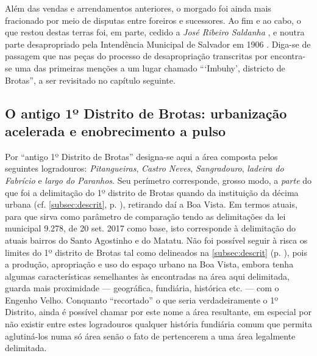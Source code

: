 Além das vendas e arrendamentos anteriores, o morgado foi ainda mais fracionado por meio de disputas entre foreiros e sucessores. Ao fim e ao cabo, o que restou destas terras foi, em parte, cedido a \textit{José Ribeiro Saldanha}%
, e noutra parte desapropriado pela Intendência Municipal de Salvador em 1906 \cite[p.~III-13 - III-14]{teixeira_doacoes_1978}. Diga-se de passagem que nas peças do processo de desapropriação transcritas por  encontra-se uma das primeiras menções a um lugar chamado ```Imbuhy', districto de Brotas'', a ser revisitado no capítulo seguinte.


\subsection{O antigo 1º Distrito de Brotas: urbanização acelerada e enobrecimento a pulso}\label{subsec:pitangueiras}

Por ``antigo 1º Distrito de Brotas'' designa-se aqui a área composta pelos seguintes logradouros: \textit{Pitangueiras}, \textit{Castro Neves}, \textit{Sangradouro}, \textit{ladeira do Fabrício} e \textit{largo do Paranhos}. Seu perímetro corresponde, grosso modo, a \textit{parte} do que foi a delimitação do 1º distrito de Brotas quando da instituição da décima urbana (cf. \autoref{subsec:descrit}, p. \pageref{subsec:descrit}), retirando daí a Boa  Vista. Em termos atuais, para que sirva como parâmetro de comparação tendo as delimitações da lei municipal 9.278, de 20 set. 2017 como base, isto corresponde à delimitação do atuais bairros do Santo Agostinho e do Matatu. Não foi possível seguir à risca os limites do 1º distrito de Brotas tal como delineados na \autoref{subsec:descrit} (p. \pageref{subsec:descrit}), pois a produção, apropriação e uso do espaço urbano na Boa Vista, embora tenha algumas características semelhantes às encontradas na área aqui delimitada, guarda mais proximidade --- geográfica, fundiária, histórica etc. --- com o Engenho Velho. Conquanto ``recortado'' o que seria verdadeiramente o 1º Distrito, ainda é possível chamar por este nome a área resultante, em especial por não existir entre estes logradouros qualquer história fundiária comum que permita aglutiná-los numa só área senão o fato de pertencerem a uma área legalmente delimitada.


